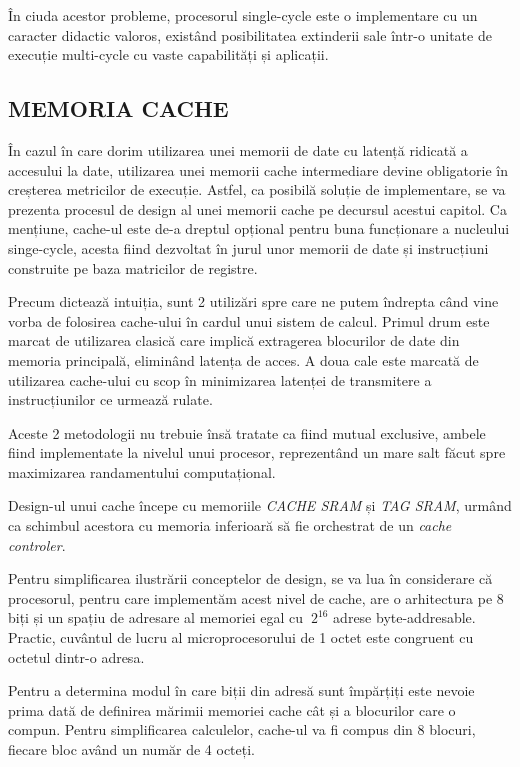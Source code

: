 \documentclass[12pt]{article}
\begin{document}
 În ciuda acestor probleme, procesorul single-cycle este o implementare cu un caracter didactic valoros, existând posibilitatea extinderii sale într-o unitate de execuție multi-cycle cu vaste capabilități și aplicații.
 
\newpage
\subsection{MEMORIA CACHE}

În cazul în care dorim utilizarea unei memorii de date cu latență ridicată a accesului la date, utilizarea unei memorii cache intermediare devine obligatorie în creșterea metricilor de execuție. Astfel, ca posibilă soluție de implementare, se va prezenta procesul de design al unei memorii cache pe decursul acestui capitol. Ca mențiune, cache-ul este de-a dreptul opțional pentru buna funcționare a nucleului singe-cycle, acesta fiind dezvoltat în jurul unor memorii de date și instrucțiuni construite pe baza matricilor de registre.
 
Precum dictează intuiția, sunt 2 utilizări spre care ne putem îndrepta când vine vorba de folosirea cache-ului în cardul unui sistem de calcul. Primul drum este marcat de utilizarea clasică care implică extragerea blocurilor de date din memoria principală, eliminând latența de acces. A doua cale este marcată de utilizarea cache-ului cu scop în minimizarea latenței de transmitere a instrucțiunilor ce urmează rulate.

Aceste 2 metodologii nu trebuie însă tratate ca fiind mutual exclusive, ambele fiind implementate la nivelul unui procesor, reprezentând un mare salt făcut spre maximizarea randamentului computațional.

Design-ul unui cache începe cu memoriile \textit{CACHE SRAM} și \textit{TAG SRAM}, urmând ca schimbul acestora cu memoria inferioară să fie orchestrat de un \textit{cache controler}.

Pentru simplificarea ilustrării conceptelor de design, se va lua în considerare că procesorul, pentru care implementăm acest nivel de cache, are o arhitectura pe 8 biți și un spațiu de adresare al memoriei egal cu $\ 2^{16}$ adrese byte-addresable. Practic, cuvântul de lucru al microprocesorului de 1 octet este congruent cu octetul dintr-o adresa.

Pentru a determina modul în care biții din adresă sunt împărțiți este nevoie prima dată de definirea mărimii memoriei cache cât și a blocurilor care o compun. Pentru simplificarea calculelor, cache-ul va fi compus din 8 blocuri, fiecare bloc având un număr de 4 octeți. 
\end{document}
